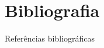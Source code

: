 \documentclass[10pt]{beamer}
\begin{document}
\section*{Bibliografia}
\begin{frame}[allowframebreaks]{Referências bibliográficas}

\end{frame}
\end{document}
